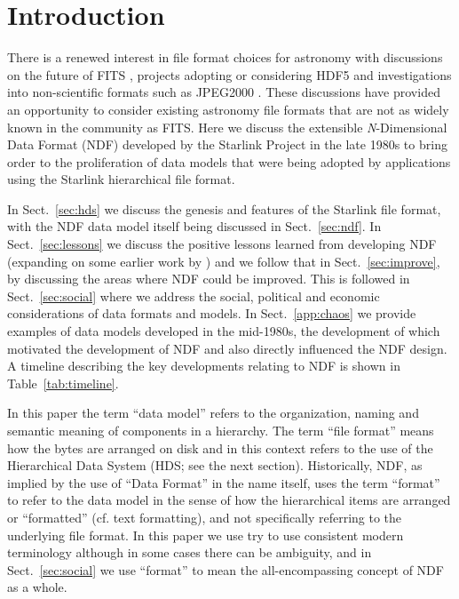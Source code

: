 \documentclass[final,authoryear,5p,times,twocolumn]{elsarticle}
\newcommand*\secref[1]{Sect.~\ref{#1}}
\begin{document}
\section{Introduction}
\label{sec:intro}

There is a renewed interest in file format choices for astronomy
with discussions on the future of FITS
\citep{P90_adassxxiii,2014Thomas}, projects adopting or considering
HDF5 \citep{2012ASPC..461..283A,jenness_spie2014} and investigations into
non-scientific formats such as JPEG2000 \citep{2014Kitaeff}. These
discussions have provided an opportunity to consider existing
astronomy file formats that are not as widely known in the community
as FITS. Here we discuss the extensible \emph{N}-Dimensional
Data Format (NDF) developed by the Starlink Project
\citep{1982MmSAI..53...55T,2000ASSL..250...93W} in the late 1980s
\citep{1988STARB...2...11C,SGP38} to bring order to the proliferation
of data models that were being adopted by applications using the Starlink
hierarchical file format.

In \secref{sec:hds} we discuss the genesis and features of the
Starlink file format, with the NDF data model itself being discussed
in \secref{sec:ndf}.  In \secref{sec:lessons} we discuss the positive
lessons learned from developing NDF (expanding on some earlier work
by \citet{P91_adassxxiii}) and we follow that in \secref{sec:improve},
by discussing the areas where NDF could be improved. This
is followed in \secref{sec:social} where we address the social,
political and economic considerations of data formats and models. In
\secref{app:chaos} we provide examples of data models developed in the
mid-1980s, the development of which motivated the development of NDF
and also directly influenced the NDF design. A timeline describing the
key developments relating to NDF is shown in Table~\ref{tab:timeline}.

In this paper the term ``data model'' refers to the organization,
naming and semantic meaning of components in a hierarchy. The term
``file format'' means how the bytes are arranged on disk and
in this context refers to the use of the Hierarchical Data System
(HDS; see the next section). Historically, NDF, as implied by the use
of ``Data Format'' in the name itself, uses the term ``format'' to refer to
the data model in the sense of how the hierarchical items are arranged
or ``formatted'' (cf. text formatting), and not specifically referring
to the underlying file format. In this paper we use try to use
consistent modern terminology although in some cases there can be ambiguity,
and in \secref{sec:social} we use ``format'' to mean the all-encompassing
concept of NDF as a whole.
\end{document}
